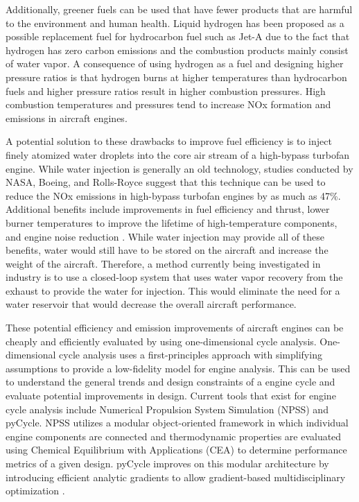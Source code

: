 \documentclass[conf]{new-aiaa}
\begin{document}
Additionally, greener fuels can be used that have fewer products that are harmful to the environment and human health.
Liquid hydrogen has been proposed as a possible replacement fuel for hydrocarbon fuel such as Jet-A due to the fact that hydrogen has zero carbon emissions and the combustion products mainly consist of water vapor.
A consequence of using hydrogen as a fuel and designing higher pressure ratios is that hydrogen burns at higher temperatures than hydrocarbon fuels and higher pressure ratios result in higher combustion pressures.
High combustion temperatures and pressures tend to increase NOx formation and emissions in aircraft engines.

A potential solution to these drawbacks to improve fuel efficiency is to inject finely atomized water droplets into the core air stream of a high-bypass turbofan engine.
While water injection is generally an old technology, studies conducted by NASA, Boeing, and Rolls-Royce suggest that this technique can be used to reduce the NOx emissions in high-bypass turbofan engines by as much as 47\%.
Additional benefits include improvements in fuel efficiency and thrust, lower burner temperatures to improve the lifetime of high-temperature components, and engine noise reduction \cite{nasa_inject}.
While water injection may provide all of these benefits, water would still have to be stored on the aircraft and increase the weight of the aircraft.
Therefore, a method currently being investigated in industry is to use a closed-loop system that uses water vapor recovery from the exhaust to provide the water for injection.
This would eliminate the need for a water reservoir that would decrease the overall aircraft performance.

These potential efficiency and emission improvements of aircraft engines can be cheaply and efficiently evaluated by using one-dimensional cycle analysis.
One-dimensional cycle analysis uses a first-principles approach with simplifying assumptions to provide a low-fidelity model for engine analysis.
This can be used to understand the general trends and design constraints of a engine cycle and evaluate potential improvements in design. Current tools that exist for engine cycle analysis include Numerical Propulsion System Simulation (NPSS) and pyCycle.
NPSS utilizes a modular object-oriented framework in which individual engine components are connected and thermodynamic properties are evaluated using Chemical Equilibrium with Applications (CEA) to determine performance metrics of a given design.
pyCycle improves on this modular architecture by introducing efficient analytic gradients to allow gradient-based multidisciplinary optimization \cite{Hendricks2019}.
\end{document}
